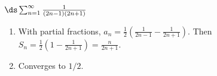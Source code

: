 {$\ds \sum_{n=1}^\infty \frac{1}{(2n-1)(2n+1)}$
}
{\begin{enumerate}
\item	With partial fractions, $a_n = \frac12\left(\frac{1}{2n-1}-\frac{1}{2n+1}\right)$. Then $S_n = \frac12\left(1-\frac1{2n+1}\right) = \frac{n}{2n+1}$.
\item	Converges to $1/2$.
\end{enumerate}
}
